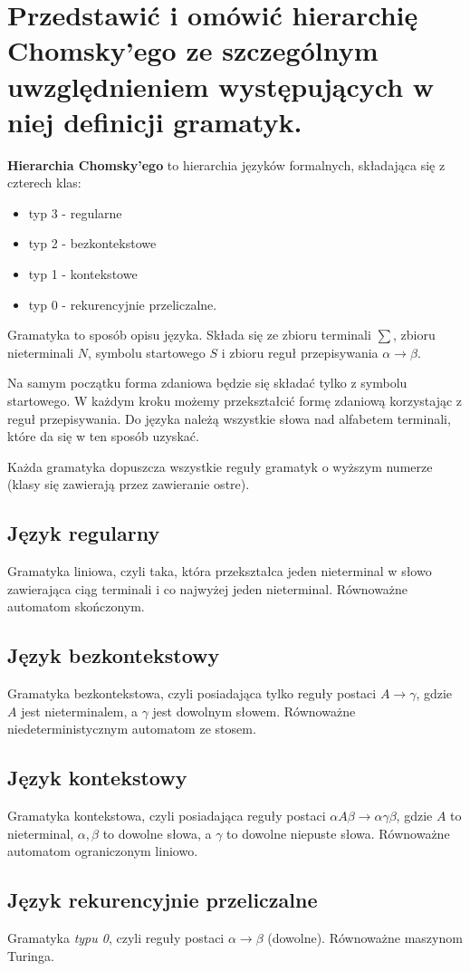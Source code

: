 \section{Przedstawić i omówić hierarchię Chomsky’ego
ze szczególnym uwzględnieniem występujących w niej definicji gramatyk.}

\textbf{Hierarchia Chomsky’ego} to hierarchia języków formalnych, składająca się z czterech klas:
\begin{itemize}[itemsep=0pt,partopsep=0pt, parsep=0pt]
    \item typ 3 - regularne
    \item typ 2 - bezkontekstowe
    \item typ 1 - kontekstowe
    \item typ 0 - rekurencyjnie przeliczalne.
\end{itemize}
Gramatyka to sposób opisu języka.
Składa się ze zbioru terminali $\sum$, zbioru nieterminali $N$,
symbolu startowego $S$ i zbioru reguł przepisywania $\alpha\longrightarrow\beta$.

Na samym początku forma zdaniowa będzie się składać tylko z symbolu startowego.
W każdym kroku możemy przekształcić formę zdaniową korzystając z reguł przepisywania.
Do języka należą wszystkie słowa nad alfabetem terminali, które da się w ten sposób uzyskać.

Każda gramatyka dopuszcza wszystkie reguły gramatyk o wyższym numerze (klasy się zawierają przez zawieranie ostre).

\subsection{Język regularny}
Gramatyka liniowa, czyli taka,
która przekształca jeden nieterminal w słowo zawierająca ciąg terminali i co najwyżej jeden nieterminal.
Równoważne automatom skończonym.

\subsection{Język bezkontekstowy}
Gramatyka bezkontekstowa, czyli posiadająca tylko reguły postaci $A\longrightarrow\gamma$, gdzie $A$ jest nieterminalem,
a $\gamma$ jest dowolnym słowem.
Równoważne niedeterministycznym automatom ze stosem.

\subsection{Język kontekstowy}
Gramatyka kontekstowa, czyli posiadająca reguły postaci $\alpha A\beta\longrightarrow\alpha\gamma\beta$,
gdzie $A$ to nieterminal, $\alpha, \beta$ to dowolne słowa, a $\gamma$ to dowolne niepuste słowa.
Równoważne automatom ograniczonym liniowo.

\subsection{Język rekurencyjnie przeliczalne}
Gramatyka \textit{typu 0}, czyli reguły postaci $\alpha\longrightarrow\beta$ (dowolne).
Równoważne maszynom Turinga.
